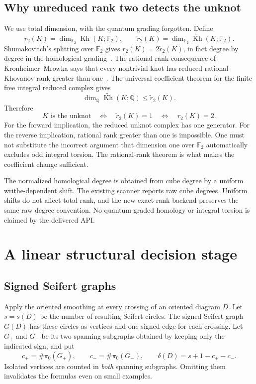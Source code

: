 \documentclass[11pt,letterpaper]{article}
\newcommand{\F}{\mathbb F_2}
\newcommand{\Q}{\mathbb Q}
\newcommand{\Kh}{\operatorname{Kh}}
\newcommand{\rKh}{\widetilde{\operatorname{Kh}}}
\begin{document}
\subsection{Why unreduced rank two detects the unknot}
We use total dimension, with the quantum grading forgotten. Define
\[
 r_2(K)=\dim_{\F}\Kh(K;\F),\qquad
 \widetilde r_2(K)=\dim_{\F}\rKh(K;\F).
\]
Shumakovitch's splitting over $\F$ gives
$r_2(K)=2\widetilde r_2(K)$, in fact degree by degree in the homological
grading~\cite[Corollary 3.2.C]{shumakovitch}. The rational-rank consequence
of Kronheimer--Mrowka says that every nontrivial knot has reduced rational
Khovanov rank greater than one~\cite{km}. The universal coefficient theorem
for the finite free integral reduced complex gives
\[
 \dim_{\Q}\rKh(K;\Q)\le\widetilde r_2(K).
\]
Therefore
\begin{equation}\label{eq:rankcriterion}
 K\text{ is the unknot}\quad\Longleftrightarrow\quad
 \widetilde r_2(K)=1\quad\Longleftrightarrow\quad r_2(K)=2.
\end{equation}
For the forward implication, the reduced unknot complex has one generator.
For the reverse implication, rational rank greater than one is impossible.
One must not substitute the incorrect argument that dimension one over $\F$
automatically excludes odd integral torsion. The rational-rank theorem is
what makes the coefficient change sufficient.

The normalized homological degree is obtained from cube degree by a uniform
writhe-dependent shift. The existing scanner reports raw cube degrees.
Uniform shifts do not affect total rank, and the new exact-rank backend
preserves the same raw degree convention. No quantum-graded homology or
integral torsion is claimed by the delivered API.

\section{A linear structural decision stage}
\label{sec:seifert}

\subsection{Signed Seifert graphs}
Apply the oriented smoothing at every crossing of an oriented diagram $D$.
Let $s=s(D)$ be the number of resulting Seifert circles. The signed Seifert
graph $G(D)$ has these circles as vertices and one signed edge for each
crossing. Let $G_+$ and $G_-$ be its two spanning subgraphs obtained by keeping
only the indicated sign, and put
\[
 c_+=\#\pi_0(G_+),\qquad c_-=\#\pi_0(G_-),\qquad
 \delta(D)=s+1-c_+-c_-.
\]
Isolated vertices are counted in \emph{both} spanning subgraphs. Omitting them
invalidates the formulas even on small examples.
\end{document}
